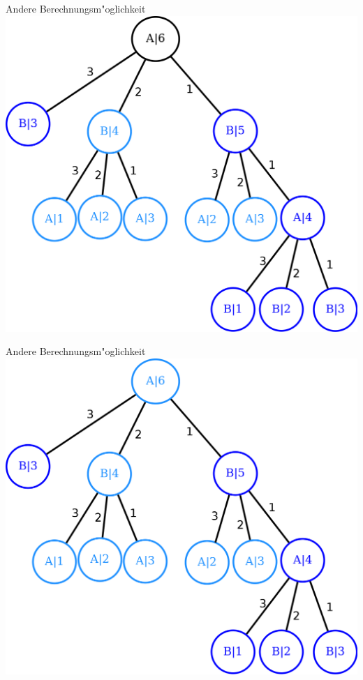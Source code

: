 \documentclass[18pt]{beamer}
\begin{document}
\begin{frame}{Andere Berechnungsm"oglichkeit}
\includegraphics[scale=0.55]{baum17.png}
\end{frame}

\begin{frame}{Andere Berechnungsm"oglichkeit}
\includegraphics[scale=0.55]{baum18.png}
\end{frame}
\end{document}
